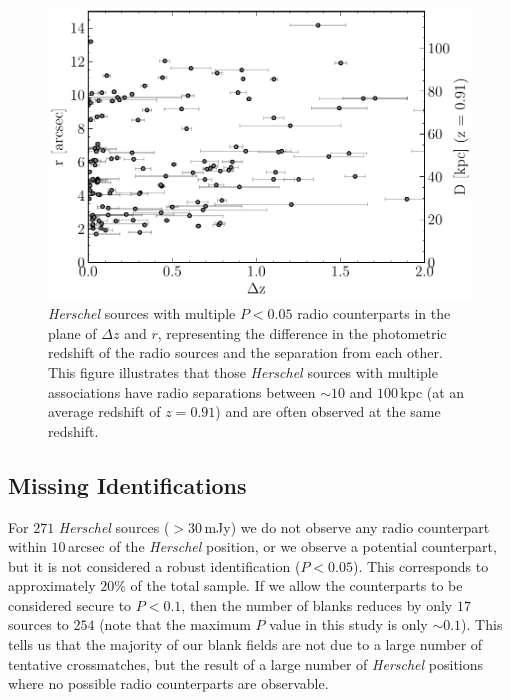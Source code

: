 \begin{figure}
	\centering
	\includegraphics[width=0.8\columnwidth]{Figures/multiples_separation.pdf}
	\caption[Physical separation between radio IDs for a single \textit{Herschel} source]{\textit{Herschel} sources with multiple $P < 0.05$ radio counterparts in the plane of $\Delta z$ and $r$, representing the difference in the photometric redshift of the radio sources and the separation from each other. This figure illustrates that those \textit{Herschel} sources with multiple associations have radio separations between $\sim 10$ and $100\,$kpc (at an average redshift of $z = 0.91$) and are often observed at the same redshift.}
	\label{fig:multiples_separation}
\end{figure}

\subsection{Missing Identifications}

For $271$ \textit{Herschel} sources ($> 30\,$mJy) we do not observe any radio counterpart within $10\,$arcsec of the \textit{Herschel} position, or we observe a potential counterpart, but it is not considered a robust identification ($P < 0.05$). This corresponds to approximately $20\%$ of the total sample. If we allow the counterparts to be considered secure to $P < 0.1$, then the number of blanks reduces by only $17$ sources to $254$ (note that the maximum $P$ value in this study is only $\sim 0.1$). This tells us that the majority of our blank fields are not due to a large number of tentative crossmatches, but the result of a large number of \textit{Herschel} positions where no possible radio counterparts are observable.

